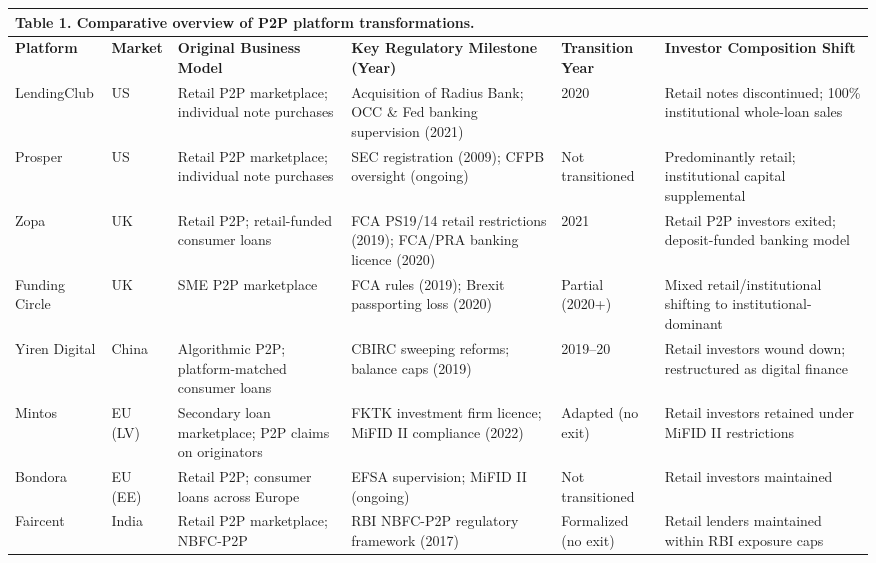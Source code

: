 \documentclass[pdflatex,sn-apa]{sn-jnl}%
\theoremstyle{thmstyleone}%
\theoremstyle{thmstyletwo}%
\theoremstyle{thmstylethree}%
\begin{document}
\begin{center}
{\footnotesize
\setlength{\tabcolsep}{3pt}
\begin{tabular}{p{1.7cm} p{1.0cm} p{2.5cm} p{3.5cm} p{1.5cm} p{2.5cm}}

\multicolumn{6}{l}{\textbf{Table 1.} Comparative overview of P2P platform transformations.} \\

\toprule
\textbf{Platform} & \textbf{Market} & \textbf{Original Business Model} & \textbf{Key Regulatory Milestone (Year)} & \textbf{Transition Year} & \textbf{Investor Composition Shift} \\
\midrule
LendingClub & US & Retail P2P marketplace; individual note purchases & Acquisition of Radius Bank; OCC \& Fed banking supervision (2021) & 2020 & Retail notes discontinued; 100\% institutional whole-loan sales \\
\addlinespace
Prosper & US & Retail P2P marketplace; individual note purchases & SEC registration (2009); CFPB oversight (ongoing) & Not transitioned & Predominantly retail; institutional capital supplemental \\
\addlinespace
Zopa & UK & Retail P2P; retail-funded consumer loans & FCA PS19/14 retail restrictions (2019); FCA/PRA banking licence (2020) & 2021 & Retail P2P investors exited; deposit-funded banking model \\
\addlinespace
Funding Circle & UK & SME P2P marketplace & FCA rules (2019); Brexit passporting loss (2020) & Partial (2020+) & Mixed retail/institutional shifting to institutional-dominant \\
\addlinespace
Yiren Digital & China & Algorithmic P2P; platform-matched consumer loans & CBIRC sweeping reforms; balance caps (2019) & 2019--20 & Retail investors wound down; restructured as digital finance \\
\addlinespace
Mintos & EU (LV) & Secondary loan marketplace; P2P claims on originators & FKTK investment firm licence; MiFID II compliance (2022) & Adapted (no exit) & Retail investors retained under MiFID II restrictions \\
\addlinespace
Bondora & EU (EE) & Retail P2P; consumer loans across Europe & EFSA supervision; MiFID II (ongoing) & Not transitioned & Retail investors maintained \\
\addlinespace
Faircent & India & Retail P2P marketplace; NBFC-P2P & RBI NBFC-P2P regulatory framework (2017) & Formalized (no exit) & Retail lenders maintained within RBI exposure caps \\
\bottomrule
\end{tabular}
}
\end{center}
\end{document}
